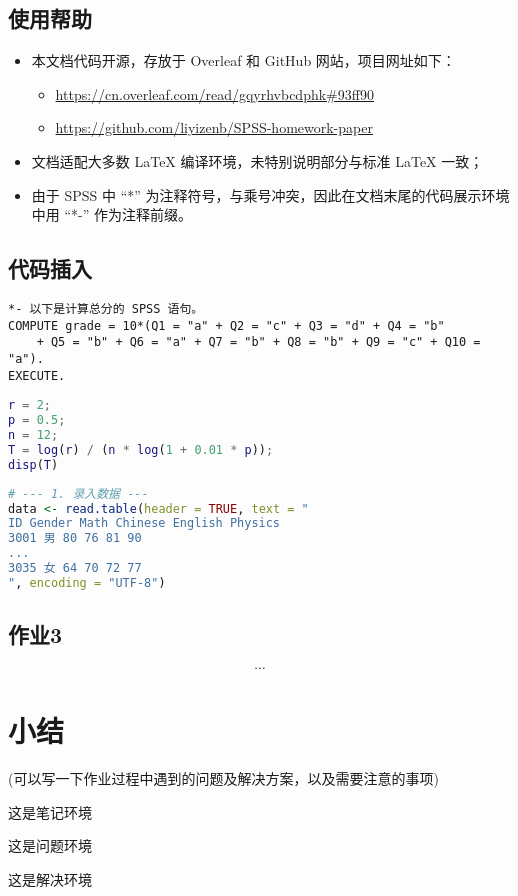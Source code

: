 \documentclass[12pt]{HomeWork}
\begin{document}
\subsection{使用帮助}
\begin{itemize}
    \item 本文档代码开源，存放于 Overleaf 和 GitHub 网站，项目网址如下：
    \begin{itemize}
        \item \href{https://cn.overleaf.com/read/gqyrhvbcdphk\#93ff90}{\url{https://cn.overleaf.com/read/gqyrhvbcdphk\#93ff90}}
        \item \href{https://github.com/liyizenb/SPSS-homework-paper}{\url{https://github.com/liyizenb/SPSS-homework-paper}}
    \end{itemize}
    \item 文档适配大多数 LaTeX 编译环境，未特别说明部分与标准 LaTeX 一致；
    \item 由于 SPSS 中 ``*'' 为注释符号，与乘号冲突，因此在文档末尾的代码展示环境中用 ``*-'' 作为注释前缀。
\end{itemize}

\subsection{代码插入}
\begin{lstlisting}[language=SPSS, caption={SPSS 代码示例}]
*- 以下是计算总分的 SPSS 语句。
COMPUTE grade = 10*(Q1 = "a" + Q2 = "c" + Q3 = "d" + Q4 = "b" 
    + Q5 = "b" + Q6 = "a" + Q7 = "b" + Q8 = "b" + Q9 = "c" + Q10 = "a").
EXECUTE.
\end{lstlisting}
\begin{lstlisting}[language=Matlab, caption={Matlab 代码示例}]
r = 2;
p = 0.5;
n = 12;
T = log(r) / (n * log(1 + 0.01 * p));
disp(T)
\end{lstlisting}
\begin{lstlisting}[language=R, caption={R语言 代码示例}]
# --- 1. 录入数据 ---
data <- read.table(header = TRUE, text = "
ID Gender Math Chinese English Physics
3001 男 80 76 81 90
...
3035 女 64 70 72 77
", encoding = "UTF-8")
\end{lstlisting}

\subsection{作业3}
$$\cdots$$



\section*{小结}
(可以写一下作业过程中遇到的问题及解决方案，以及需要注意的事项)

\begin{note}
    这是笔记环境
\end{note}

\begin{prb}
    这是问题环境
\end{prb}

\begin{soln}
    这是解决环境
\end{soln}
\end{document}
